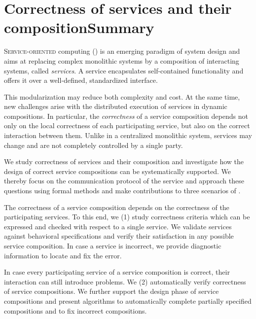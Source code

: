 
\markleft{}
\markright{}


\begingroup
\let\clearpage\relax
\let\cleardoublepage\relax
\let\cleardoublepage\relax




\chapter*{Correctness of services and their composition\vspace{0.1em}\newline Summary}

\lettrine[findent=.1em,lines=2,nindent=0em]{S}{ervice-oriented} computing () is an emerging paradigm of system design and aims at replacing complex monolithic systems by a composition of interacting systems, called \emph{services}. A service encapsulates self-contained functionality and offers it over a well-defined, standardized interface.

This modularization may reduce both complexity and cost. At the same time, new challenges arise with the distributed execution of services in dynamic compositions. In particular, the \emph{correctness} of a service composition depends not only on the local correctness of each participating service, but also on the correct interaction between them. Unlike in a centralized monolithic system, services may change and are not completely controlled by a single party.

We study correctness of services and their composition and investigate how the design of correct service compositions can be systematically supported. We thereby focus on the communication protocol of the service and approach these questions using formal methods and make contributions to three scenarios of .

The correctness of a service composition depends on the correctness of the participating services. To this end, we (1) study correctness criteria which can be expressed and checked with respect to a single service. We validate services against behavioral specifications and verify their satisfaction in any possible service composition. In case a service is incorrect, we provide diagnostic information to locate and fix the error.

In case every participating service of a service composition is correct, their interaction can still introduce problems. We (2) automatically verify correctness of service compositions. We further support the design phase of service compositions and present algorithms to automatically complete partially specified compositions and to fix incorrect compositions.

